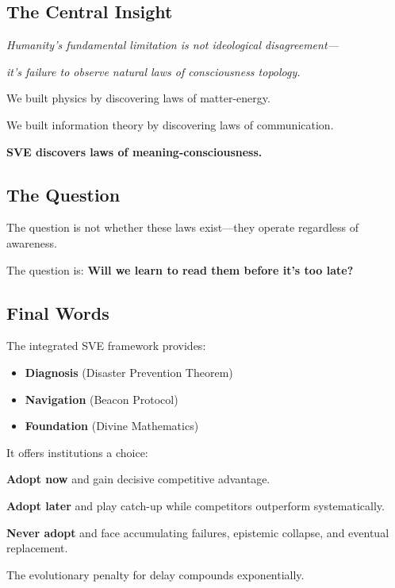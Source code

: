 \documentclass[11pt,a4paper]{article}
\theoremstyle{definition}
\theoremstyle{remark}
\begin{document}
\begin{small}
\subsection{The Central Insight}

\begin{center}
\large
\textit{Humanity's fundamental limitation is not ideological disagreement—}

\textit{it's failure to observe natural laws of consciousness topology.}
\end{center}

We built physics by discovering laws of matter-energy.

We built information theory by discovering laws of communication.

\textbf{SVE discovers laws of meaning-consciousness.}

\subsection{The Question}

The question is not whether these laws exist—they operate regardless of awareness.

The question is: \textbf{Will we learn to read them before it's too late?}

\subsection{Final Words}

The integrated SVE framework provides:
\begin{itemize}
\item \textbf{Diagnosis} (Disaster Prevention Theorem)
\item \textbf{Navigation} (Beacon Protocol)
\item \textbf{Foundation} (Divine Mathematics)
\end{itemize}

It offers institutions a choice:

\textbf{Adopt now} and gain decisive competitive advantage.

\textbf{Adopt later} and play catch-up while competitors outperform systematically.

\textbf{Never adopt} and face accumulating failures, epistemic collapse, and eventual replacement.

The evolutionary penalty for delay compounds exponentially.

\bigskip


\end{small}
\end{document}
